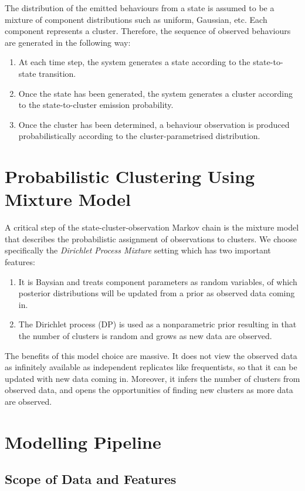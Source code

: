 \documentclass[english,a4,oneside,9pt]{extarticle}
\begin{document}
The distribution of the emitted behaviours from a state is assumed to be a mixture of component distributions such as uniform, Gaussian, etc. Each component represents a cluster. Therefore, the sequence of observed behaviours are generated in the following way:
\begin{enumerate}
\item At each time step, the system generates a state according to the state-to-state transition.
\item Once the state has been generated, the system generates a cluster according to the state-to-cluster emission probability.
\item Once the cluster has been determined, a behaviour observation is produced probabilistically according to the cluster-parametrised distribution.
\end{enumerate}

\section{Probabilistic Clustering Using Mixture Model}

A critical step of the state-cluster-observation Markov chain is the mixture model that describes the probabilistic assignment of observations to clusters. We choose specifically the \textit{Dirichlet Process Mixture} setting \cite{blei2006} which has two important features:
\begin{enumerate}
\item It is Baysian and treats component parameters as random variables, of which posterior distributions will be updated from a prior as observed data coming in. 
\item The Dirichlet process (DP) is used as a nonparametric prior resulting in that the number of clusters is random and grows as new data are observed.
\end{enumerate}
The benefits of this model choice are massive. It does not view the observed data as infinitely available as independent replicates like frequentists, so that it can be updated with new data coming in. Moreover, it infers the number of clusters from observed data, and opens the opportunities of finding new clusters as more data are observed.

\section{Modelling Pipeline}

\subsection*{Scope of Data and Features}
\end{document}
